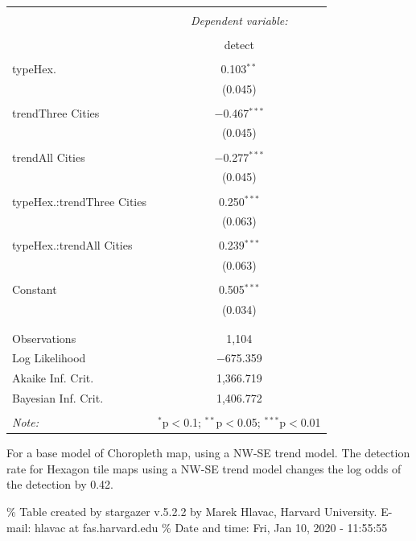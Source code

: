 \documentclass[conference,final,]{IEEEtran}
\begin{document}
\begin{table}[!htbp] \centering 
  \caption{} 
  \label{} 
\begin{tabular}{@{\extracolsep{5pt}}lc} 
\\[-1.8ex]\hline 
\hline \\[-1.8ex] 
 & \multicolumn{1}{c}{\textit{Dependent variable:}} \\ 
\cline{2-2} 
\\[-1.8ex] & detect \\ 
\hline \\[-1.8ex] 
 typeHex. & 0.103$^{**}$ \\ 
  & (0.045) \\ 
  & \\ 
 trendThree Cities & $-$0.467$^{***}$ \\ 
  & (0.045) \\ 
  & \\ 
 trendAll Cities & $-$0.277$^{***}$ \\ 
  & (0.045) \\ 
  & \\ 
 typeHex.:trendThree Cities & 0.250$^{***}$ \\ 
  & (0.063) \\ 
  & \\ 
 typeHex.:trendAll Cities & 0.239$^{***}$ \\ 
  & (0.063) \\ 
  & \\ 
 Constant & 0.505$^{***}$ \\ 
  & (0.034) \\ 
  & \\ 
\hline \\[-1.8ex] 
Observations & 1,104 \\ 
Log Likelihood & $-$675.359 \\ 
Akaike Inf. Crit. & 1,366.719 \\ 
Bayesian Inf. Crit. & 1,406.772 \\ 
\hline 
\hline \\[-1.8ex] 
\textit{Note:}  & \multicolumn{1}{r}{$^{*}$p$<$0.1; $^{**}$p$<$0.05; $^{***}$p$<$0.01} \\ 
\end{tabular} 
\end{table}

For a base model of Choropleth map, using a NW-SE trend model. The
detection rate for Hexagon tile maps using a NW-SE trend model changes
the log odds of the detection by 0.42.

\% Table created by stargazer v.5.2.2 by Marek Hlavac, Harvard
University. E-mail: hlavac at fas.harvard.edu \% Date and time: Fri, Jan
10, 2020 - 11:55:55
\end{document}
